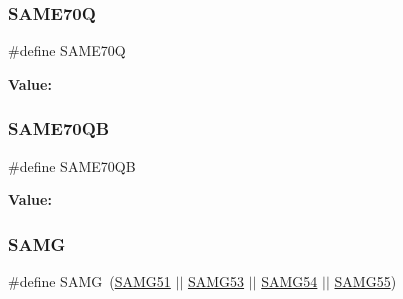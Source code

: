 \subsubsection{\texorpdfstring{SAME70Q}{SAME70Q}}
{\footnotesize\ttfamily \#define S\+A\+M\+E70Q}

{\bfseries Value\+:}
\begin{DoxyCode}{0}
\DoxyCodeLine{( \(\backslash\)}
\DoxyCodeLine{    )}

\end{DoxyCode}
\mbox{\label{group__sam__part__macros__group_ga1a873ec232758ffa5fae2ba4f925f8f9}} 
\subsubsection{\texorpdfstring{SAME70QB}{SAME70QB}}
{\footnotesize\ttfamily \#define S\+A\+M\+E70\+QB}

{\bfseries Value\+:}
\begin{DoxyCode}{0}
\DoxyCodeLine{( \(\backslash\)}
\DoxyCodeLine{    )}

\end{DoxyCode}
\mbox{\label{group__sam__part__macros__group_gad4ae7782abc1e1087067d9958af3381c}} 
\subsubsection{\texorpdfstring{SAMG}{SAMG}}
{\footnotesize\ttfamily \#define S\+A\+MG~(\mbox{\hyperlink{group__sam__part__macros__group_gacd7261d3389d2f5c745e64ffe1b89d99}{S\+A\+M\+G51}} $\vert$$\vert$ \mbox{\hyperlink{group__sam__part__macros__group_gaee5167c2eae38c830d175d48769391d8}{S\+A\+M\+G53}} $\vert$$\vert$ \mbox{\hyperlink{group__sam__part__macros__group_ga0cd510d1aac0c983cf19398f7dd2b6a1}{S\+A\+M\+G54}} $\vert$$\vert$ \mbox{\hyperlink{group__sam__part__macros__group_ga80c14f26d62169592dd858e259b440de}{S\+A\+M\+G55}})}

